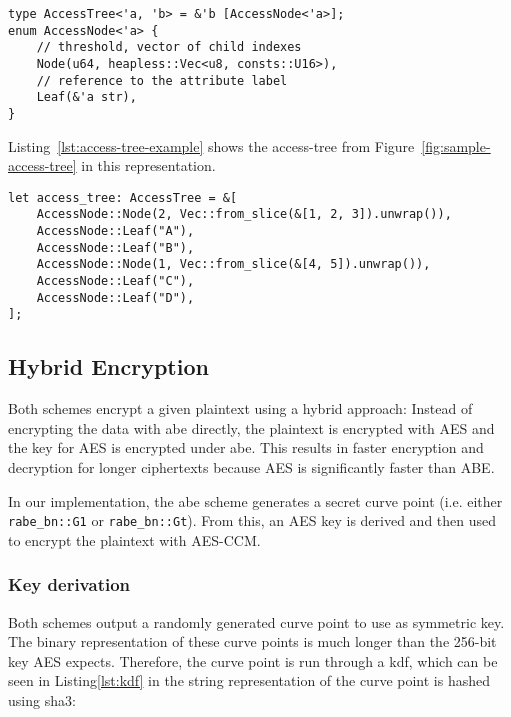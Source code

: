 \begin{lstlisting}[caption={Refined implementation of Access Trees (works without standard library)},label={lst:access-tree-heapless}]
type AccessTree<'a, 'b> = &'b [AccessNode<'a>];
enum AccessNode<'a> {
    // threshold, vector of child indexes
    Node(u64, heapless::Vec<u8, consts::U16>),
    // reference to the attribute label
    Leaf(&'a str),
}
\end{lstlisting}

Listing~\ref{lst:access-tree-example} shows the \gls{access-tree} from Figure~\ref{fig:sample-access-tree} in this representation.

\begin{lstlisting}[caption={Sample access tree in the heapless Rust representation},label={lst:access-tree-example}]
let access_tree: AccessTree = &[
    AccessNode::Node(2, Vec::from_slice(&[1, 2, 3]).unwrap()),
    AccessNode::Leaf("A"),
    AccessNode::Leaf("B"),
    AccessNode::Node(1, Vec::from_slice(&[4, 5]).unwrap()),
    AccessNode::Leaf("C"),
    AccessNode::Leaf("D"),
];
\end{lstlisting}

\subsection{Hybrid Encryption}
Both schemes encrypt a given plaintext using a hybrid approach:
Instead of encrypting the data with \acrshort{abe} directly, the plaintext is encrypted with AES and the key for AES is encrypted under \acrshort{abe}.
This results in faster encryption and decryption for longer ciphertexts because AES is significantly faster than ABE.

In our implementation, the \acrshort{abe} scheme generates a secret curve point (i.e. either \verb+rabe_bn::G1+ or \verb+rabe_bn::Gt+).
From this, an AES key is derived and then used to encrypt the plaintext with AES-CCM.

\subsubsection{Key derivation}
Both schemes output a randomly generated curve point to use as symmetric key.
The binary representation of these curve points is much longer than the 256-bit key AES expects.
Therefore, the curve point is run through a \gls{kdf}, which can be seen in Listing\ref{lst:kdf} in the string representation of the curve point is hashed using \acrshort{sha3}:

